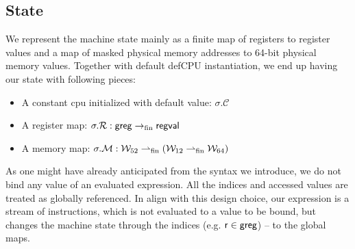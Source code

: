 \subsection{State}
\label{sec:state}
We represent the machine state mainly as a finite map of registers to register values and a map of masked physical memory addresses to 64-bit physical memory values. Together with default def\textsf{CPU} instantiation, we end up having our state with following pieces:
\begin{itemize}
\item A constant cpu initialized with default value: $\sigma.\mathcal{C}$
\item A register map: $\sigma.\mathcal{R}: \mathsf{greg} \rightarrow_{\textrm{fin}} \mathsf{regval} $
\item A memory map: $\sigma.\mathcal{M}: \mathcal{W}_{52} \rightharpoonup_{\textrm{fin}} (\mathcal{W}_{12} \rightharpoonup_{\textrm{fin}} \mathcal{W}_{64} )$
\end{itemize}
As one might have already anticipated from the syntax we introduce, we do not bind any value of an evaluated expression. All the indices and accessed values are treated as globally referenced. In align with this design choice, our expression is a stream of instructions, which is not evaluated to a value to be bound, but changes the machine state through the indices (e.g. $\mathsf{r}\in\mathsf{greg}$) -- to the global maps. 
%
